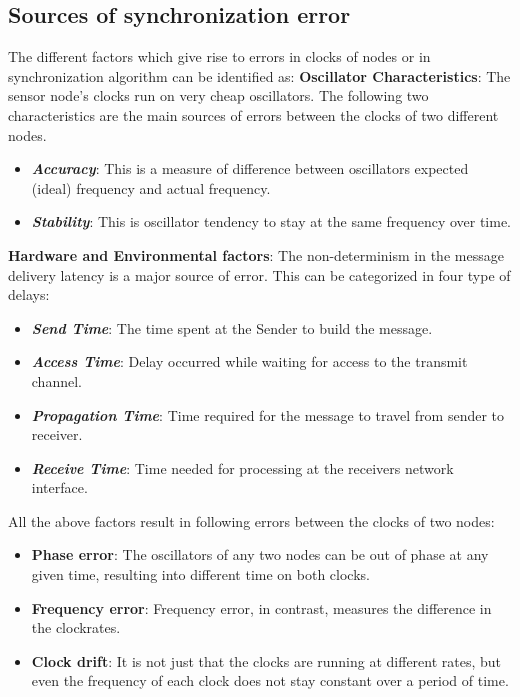 \documentclass[journal]{IEEEtran}
\begin{document}
\subsection{\textbf{Sources of synchronization error}}
The different factors which give rise to errors in clocks of nodes or in synchronization
algorithm can be identified as:\newline
\textbf{Oscillator Characteristics}: The sensor node's clocks run on very cheap oscillators.
      The following two characteristics are the main sources of errors between the clocks
      of two different nodes.
         \begin{itemize}
         \item \emph{\textbf{Accuracy}}: This is a measure of difference between oscillators expected (ideal)
           frequency and actual frequency. 
         \item \emph{\textbf{Stability}}: This is oscillator tendency to stay at the same frequency over
           time.
      \end{itemize}
\textbf{Hardware and Environmental factors}: The non-determinism in the message delivery latency
      is a major source of error. This can be categorized in four type of
      delays:
      \begin{itemize}
         \item \emph{\textbf{Send Time}}: The time spent at the Sender to build the message.
         \item \emph{\textbf{Access Time}}: Delay occurred while waiting for access to the transmit channel.
         \item \emph{\textbf{Propagation Time}}: Time required for the message to travel from sender to receiver.
         \item \emph{\textbf{Receive Time}}: Time needed for processing at the receivers network
         interface.
      \end{itemize}
      All the above factors result in following errors between the clocks of two nodes:
\begin{itemize}
\item \textbf{Phase error}: The oscillators of any two nodes can be out of phase at
any given time, resulting into different time on both clocks. 
\item \textbf{Frequency error}: Frequency error, in contrast, measures the difference in the clockrates.
\item \textbf{Clock drift}: It is not just that the clocks are running at different rates, but even
the frequency of each clock does not stay constant over a period of
time.
\end{itemize}
\end{document}
